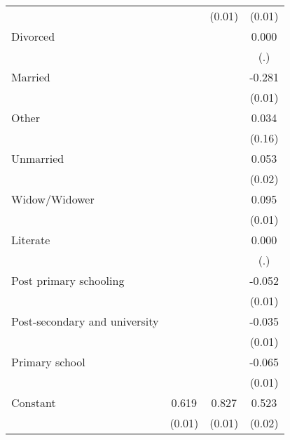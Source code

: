 {\begin{tabular}{l*{3}{c}}
                    &                     &      (0.01)         &      (0.01)         \\
Divorced            &                     &                     &       0.000         \\
                    &                     &                     &         (.)         \\
Married             &                     &                     &      -0.281\sym{***}\\
                    &                     &                     &      (0.01)         \\
Other               &                     &                     &       0.034         \\
                    &                     &                     &      (0.16)         \\
Unmarried           &                     &                     &       0.053\sym{**} \\
                    &                     &                     &      (0.02)         \\
Widow/Widower       &                     &                     &       0.095\sym{***}\\
                    &                     &                     &      (0.01)         \\
Literate            &                     &                     &       0.000         \\
                    &                     &                     &         (.)         \\
Post primary schooling&                     &                     &      -0.052\sym{***}\\
                    &                     &                     &      (0.01)         \\
Post-secondary and university&                     &                     &      -0.035\sym{**} \\
                    &                     &                     &      (0.01)         \\
Primary school      &                     &                     &      -0.065\sym{***}\\
                    &                     &                     &      (0.01)         \\
Constant            &       0.619\sym{***}&       0.827\sym{***}&       0.523\sym{***}\\
                    &      (0.01)         &      (0.01)         &      (0.02)         \\

\end{tabular}}
